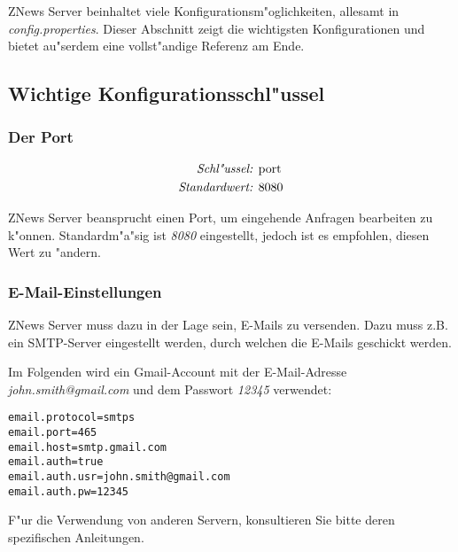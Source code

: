 ZNews Server beinhaltet viele Konfigurationsm"oglichkeiten,
allesamt in \emph{config.properties}.
Dieser Abschnitt zeigt die wichtigsten Konfigurationen
und bietet au"serdem eine vollst"andige Referenz am Ende.

\subsection{Wichtige Konfigurationsschl"ussel}

\subsubsection{Der Port} \label{sec:config:port}

\begin{align*}
    \emph{Schl"ussel: } & \lstinline{port}\\
    \emph{Standardwert: } & \lstinline{8080}
\end{align*}

ZNews Server beansprucht einen Port, um eingehende
Anfragen bearbeiten zu k"onnen. Standardm"a"sig ist
\emph{8080} eingestellt, jedoch ist es empfohlen,
diesen Wert zu "andern.

\subsubsection{E-Mail-Einstellungen}

ZNews Server muss dazu in der Lage sein, E-Mails
zu versenden. Dazu muss z.B. ein SMTP-Server eingestellt
werden, durch welchen die E-Mails geschickt werden.

Im Folgenden wird ein Gmail-Account mit der
E-Mail-Adresse \emph{john.smith@gmail.com} und
dem Passwort \emph{12345} verwendet:

\begin{lstlisting}[]%@formatter:off
email.protocol=smtps
email.port=465
email.host=smtp.gmail.com
email.auth=true
email.auth.usr=john.smith@gmail.com
email.auth.pw=12345
\end{lstlisting}%

F"ur die Verwendung von anderen Servern, konsultieren Sie
bitte deren spezifischen Anleitungen.

